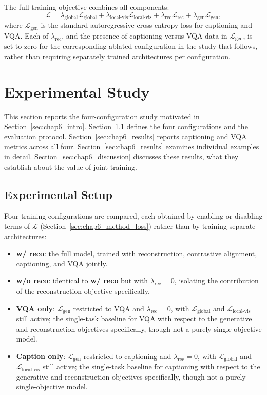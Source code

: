 The full training objective combines all components:
\[
\mathcal{L} = \lambda_{\text{global}} \mathcal{L}_{\text{global}}
+ \lambda_{\text{local-vis}} \mathcal{L}_{\text{local-vis}}
+ \lambda_{\text{rec}} \mathcal{L}_{\text{rec}}
+ \lambda_{\text{gen}} \mathcal{L}_{\text{gen}},
\]
where $\mathcal{L}_{\text{gen}}$ is the standard autoregressive
cross-entropy loss for captioning and VQA. Each of
$\lambda_{\text{rec}}$, and the presence of captioning versus VQA data
in $\mathcal{L}_{\text{gen}}$, is set to zero for the corresponding
ablated configuration in the study that follows, rather than requiring
separately trained architectures per configuration.

\section{Experimental Study}
\label{sec:chap6_experiments}

This section reports the four-configuration study motivated in
Section~\ref{sec:chap6_intro}. Section~\ref{sec:chap6_setup} defines
the four configurations and the evaluation protocol.
Section~\ref{sec:chap6_results} reports captioning and VQA metrics
across all four. Section~\ref{sec:chap6_results} examines individual examples in detail. Section~\ref{sec:chap6_discussion} discusses
these results, what they establish about the value of joint
training.

\subsection{Experimental Setup}
\label{sec:chap6_setup}

Four training configurations are compared, each obtained by enabling
or disabling terms of $\mathcal{L}$ (Section~\ref{sec:chap6_method_loss})
rather than by training separate architectures:

\begin{itemize}
\item \textbf{w/ reco}: the full model, trained with reconstruction,
contrastive alignment, captioning, and VQA jointly.
\item \textbf{w/o reco}: identical to \textbf{w/ reco} but with
$\lambda_{\text{rec}} = 0$, isolating the contribution of the
reconstruction objective specifically.
\item \textbf{VQA only}: $\mathcal{L}_{\text{gen}}$ restricted to VQA
and $\lambda_{\text{rec}} = 0$, with $\mathcal{L}_{\text{global}}$ and
$\mathcal{L}_{\text{local-vis}}$ still active; the single-task
baseline for VQA with respect to the generative and reconstruction
objectives specifically, though not a purely single-objective model.
\item \textbf{Caption only}: $\mathcal{L}_{\text{gen}}$ restricted to
captioning and $\lambda_{\text{rec}} = 0$, with $\mathcal{L}_{\text{global}}$
and $\mathcal{L}_{\text{local-vis}}$ still active; the single-task
baseline for captioning with respect to the generative and
reconstruction objectives specifically, though not a purely
single-objective model.
\end{itemize}

